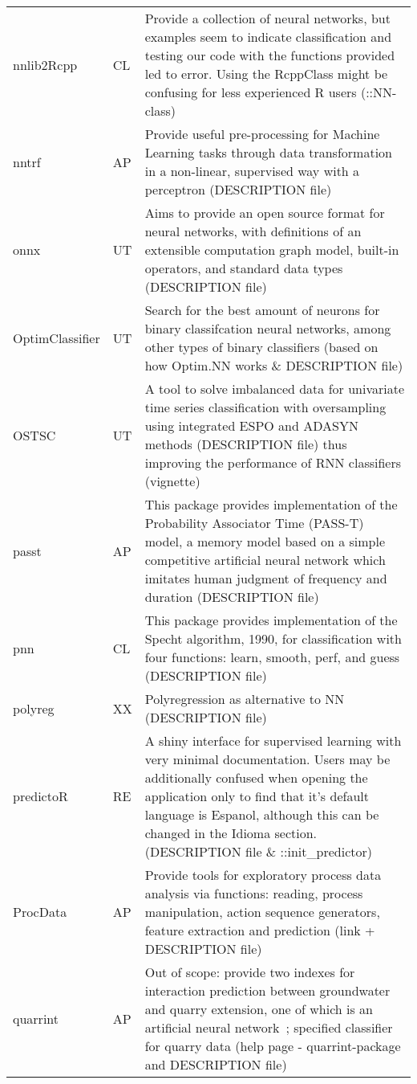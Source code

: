 \begin{Schunk}
\begin{longtable}[t]{ll>{\raggedright\arraybackslash}p{10cm}}
nnlib2Rcpp & CL & Provide a collection of neural networks, but examples seem to indicate classification and testing our code with the functions provided led to error. Using the RcppClass might be confusing for less experienced R users (::NN-class)\\
nntrf & AP & Provide useful pre-processing for Machine Learning tasks through data transformation in a non-linear, supervised way with a perceptron (DESCRIPTION file)\\
onnx & UT & Aims to provide an open source format for neural networks, with definitions of an extensible computation graph model, built-in operators, and standard data types (DESCRIPTION file)\\
\addlinespace
OptimClassifier & UT & Search for the best amount of neurons for binary classifcation neural networks, among other types of binary classifiers (based on how Optim.NN works \& DESCRIPTION file)\\
OSTSC & UT & A tool to solve imbalanced data for univariate time series classification with oversampling using integrated ESPO and ADASYN methods (DESCRIPTION file) thus improving the performance of RNN classifiers (vignette)\\
passt & AP & This package provides implementation of the Probability Associator Time (PASS-T) model, a memory model based on a simple competitive artificial neural network which imitates human judgment of frequency and duration (DESCRIPTION file)\\
pnn & CL & This package provides implementation of the Specht algorithm, 1990, for classification with four functions: learn, smooth, perf, and guess (DESCRIPTION file)\\
polyreg & XX & Polyregression as alternative to NN (DESCRIPTION file)\\
\addlinespace
predictoR & RE & A shiny interface for supervised learning with very minimal documentation. Users may be additionally confused when opening the application only to find that it's default language is Espanol, although this can be changed in the Idioma section. (DESCRIPTION file \& ::init\_predictor)\\
ProcData & AP & Provide tools for exploratory process data analysis via functions: reading, process manipulation, action sequence generators, feature extraction and prediction (link + DESCRIPTION file)\\
quarrint & AP & Out of scope: provide two indexes for interaction prediction between groundwater and quarry extension, one of which is an artificial neural network ; specified classifier for quarry data (help page - quarrint-package and DESCRIPTION file)\\

\end{longtable}
\end{Schunk}
